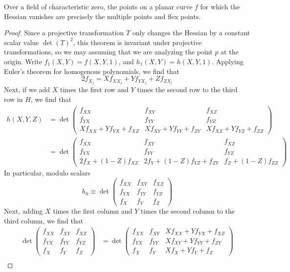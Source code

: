\begin{theorem}
    Over a field of characteristic zero, the points on a planar curve $f$ for which the Hessian vanishes are precisely the multiple points and flex points.
\end{theorem}
\begin{proof}
    Since a projective transformation $T$ only changes the Hessian by a constant scalar value $\det(T)^2$, this theorem is invariant under projective transformations, so we may assuming that we are analyzing the point $p$ at the origin. Write $f_1(X,Y) = f(X,Y,1)$, and $h_1(X,Y) = h(X,Y,1)$. Applying Euler's theorem for homogenous polynomials, we find that
    \[ 2f_{X_j} = X f_{XX_j} + Y f_{YX_j} + Z f_{ZX_j} \]
    Next, if we add $X$ times the first row and $Y$ times the second row to the third row in $H$, we find that
    \begin{align*}
        h(X,Y,Z) &= \det \begin{pmatrix} f_{XX} & f_{XY} & f_{XZ} \\ f_{YX} & f_{YY} & f_{YZ} \\ Xf_{XX} + Yf_{YX} + f_{XZ} & Xf_{XY} + Yf_{YY} + f_{ZY} & Xf_{XZ} + Yf_{YZ} + f_{ZZ} \end{pmatrix}\\
        &= \det \begin{pmatrix} f_{XX} & f_{XY} & f_{XZ} \\ f_{YX} & f_{YY} & f_{YZ} \\ 2f_X + (1 - Z)f_{XZ} & 2f_Y + (1-Z) f_{YZ} + f_{ZY} & f_Z + (1-Z)f_{ZZ} \end{pmatrix}
    \end{align*}
    In particular, modulo scalars
    \[ h_0 \equiv \det \begin{pmatrix} f_{XX} & f_{XY} & f_{XZ} \\ f_{YX} & f_{YY} & f_{YZ} \\ f_X & f_Y & f_Z \end{pmatrix} \]
    Next, adding $X$ times the first column and $Y$ times the second column to the third column, we find that
    \begin{align*}
        \det \begin{pmatrix} f_{XX} & f_{XY} & f_{XZ} \\ f_{YX} & f_{YY} & f_{YZ} \\ f_X & f_Y & f_Z \end{pmatrix} &= \det \begin{pmatrix} f_{XX} & f_{XY} & Xf_{XX} + Yf_{YX} + f_{XZ} \\ f_{YX} & f_{YY} & Xf_{XY} + Yf_{YY} + f_{ZY} \\ f_X & f_Y & Xf_X + Yf_Y + f_Z \end{pmatrix}\\

\end{align*}
\end{proof}

